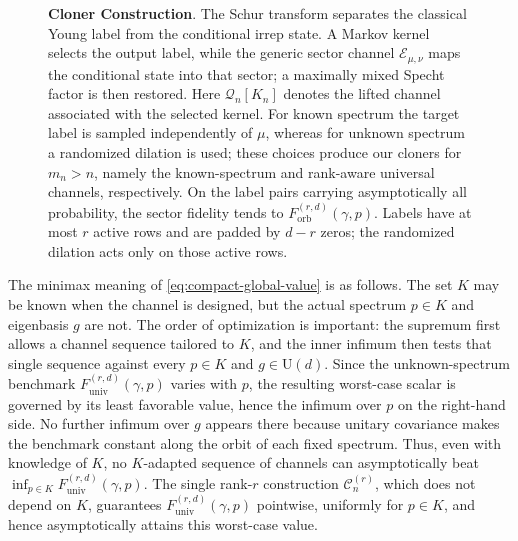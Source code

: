 \documentclass[11pt]{article}
\theoremstyle{remark}
\theoremstyle{plain}
\newcommand{\cC}{\mathcal C}
\newcommand{\cE}{\mathcal E}
\newcommand{\U}{\mathrm U}
\newcommand{\Forb}{F_{\mathrm{orb}}}
\newcommand{\Funiv}{F_{\mathrm{univ}}}
\begin{document}
\begin{figure}[!tbp]
{%
}
\caption{\textbf{Cloner Construction}.
The Schur transform separates the classical Young label from the conditional
irrep state.  A Markov kernel selects the output label, while the generic
sector channel \(\cE_{\mu,\nu}\) maps the conditional state into that sector;
a maximally mixed Specht factor is then restored. Here
\(\mathcal Q_n[K_n]\) denotes the lifted channel associated with the selected
kernel. For known spectrum the
target label is sampled independently of \(\mu\), whereas for unknown
spectrum a randomized dilation is used; these choices produce our cloners
for \(m_n>n\), namely
   the known-spectrum and rank-aware universal channels, respectively.
On the label pairs
carrying asymptotically all probability, the sector fidelity tends to
\(\Forb^{(r,d)}(\gamma,p)\).  Labels have at most \(r\) active rows and
are padded by \(d-r\) zeros; the randomized dilation acts only on those
active rows.  }
\label{fig:schur-cartan-cloner}
\end{figure}


The minimax meaning of \eqref{eq:compact-global-value} is as follows.
The set \(K\) may be known when the channel is designed, but the actual
spectrum \(p\in K\) and eigenbasis \(g\) are not.  The order of optimization
is important: the supremum first allows a channel sequence tailored to
\(K\), and the inner infimum then tests that single sequence against every
\(p\in K\) and \(g\in\U(d)\).  Since the unknown-spectrum benchmark
\(\Funiv^{(r,d)}(\gamma,p)\) varies with \(p\), the resulting worst-case scalar is
governed by its least favorable value, hence the infimum over \(p\) on the
right-hand side.  No further infimum over \(g\) appears there because
unitary covariance makes the benchmark constant along the orbit of each
fixed spectrum.  Thus, even with knowledge of \(K\), no \(K\)-adapted
sequence of channels can asymptotically beat
\(\inf_{p\in K}\Funiv^{(r,d)}(\gamma,p)\).  The single rank-\(r\)
construction \(\cC_n^{(r)}\), which does not depend on \(K\), guarantees
\(\Funiv^{(r,d)}(\gamma,p)\) pointwise, uniformly for \(p\in K\), and hence
asymptotically attains this worst-case value.
\end{document}
